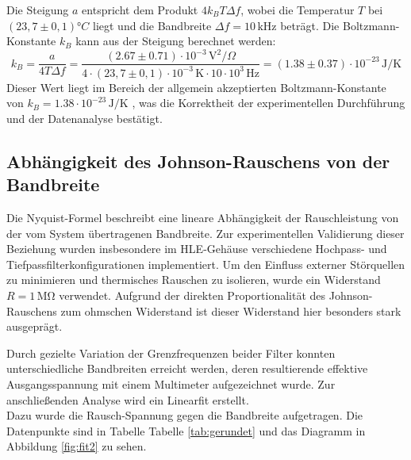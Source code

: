 \documentclass{article}
\begin{document}
Die Steigung $a$ entspricht dem Produkt $4 k_B T \Delta f$, wobei die Temperatur $T$ bei $(23,7 \pm 0,1) °C$ liegt und die Bandbreite $\Delta f = 10\,\mathrm{kHz}$ beträgt. Die Boltzmann-Konstante $k_B$ kann aus der Steigung berechnet werden:
\begin{equation}
k_B = \frac{a}{4 T \Delta f} = \frac{(2.67 \pm 0.71) \cdot 10^{-3} \,\mathrm{V}^2/\Omega}{4 \cdot (23,7 \pm 0,1) \cdot 10^{-3} \,\mathrm{K} \cdot 10 \cdot 10^3 \,\mathrm{Hz}} = (1.38 \pm 0.37) \cdot 10^{-23} \,\mathrm{J/K}
\end{equation}
Dieser Wert liegt im Bereich der allgemein akzeptierten Boltzmann-Konstante von $k_B = 1.38 \cdot 10^{-23} \,\mathrm{J/K}$ \cite{} %
, was die Korrektheit der experimentellen Durchführung und der Datenanalyse bestätigt.
\subsection{Abhängigkeit des Johnson-Rauschens von der Bandbreite}

Die Nyquist-Formel beschreibt eine lineare Abhängigkeit der Rauschleistung von der vom System übertragenen Bandbreite. Zur experimentellen Validierung dieser Beziehung wurden insbesondere im HLE-Gehäuse verschiedene Hochpass- und Tiefpassfilterkonfigurationen implementiert. Um den Einfluss externer Störquellen zu minimieren und thermisches Rauschen zu isolieren, wurde ein Widerstand \(R = 1\,\mathrm{M\Omega} \) verwendet. Aufgrund der direkten Proportionalität des Johnson-Rauschens zum ohmschen Widerstand ist dieser Widerstand hier besonders stark ausgeprägt.

Durch gezielte Variation der Grenzfrequenzen beider Filter konnten unterschiedliche Bandbreiten erreicht werden, deren resultierende effektive Ausgangsspannung mit einem Multimeter aufgezeichnet wurde. Zur anschließenden Analyse wird ein Linearfit erstellt. \\
Dazu wurde die Rausch-Spannung gegen
die Bandbreite aufgetragen. Die Datenpunkte sind in Tabelle Tabelle \ref{tab:gerundet} und das Diagramm in Abbildung \ref{fig:fit2} zu sehen. \\
\end{document}
